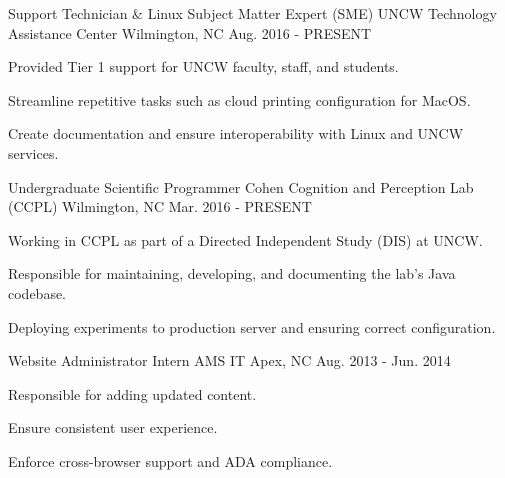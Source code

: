 

\begin{cventries}

  \cventry
    {Support Technician \& Linux Subject Matter Expert (SME)} %
    {UNCW Technology Assistance Center} %
    {Wilmington, NC} %
    {Aug. 2016 - PRESENT} %
    {
      \begin{cvitems} %
        \item {Provided Tier 1 support for UNCW faculty, staff, and students.}
        \item {Streamline repetitive tasks such as cloud printing configuration for MacOS.}
        \item {Create documentation and ensure interoperability with Linux and UNCW services.}
      \end{cvitems}
    }

  \cventry
    {Undergraduate Scientific Programmer} %
    {Cohen Cognition and Perception Lab (CCPL)} %
    {Wilmington, NC} %
    {Mar. 2016 - PRESENT} %
    {
      \begin{cvitems}
        \item {Working in CCPL as part of a Directed Independent Study (DIS) at UNCW.}
        \item {Responsible for maintaining, developing, and documenting the lab's Java codebase.}
        \item {Deploying experiments to production server and ensuring correct configuration.}
      \end{cvitems}
    }
  \cventry
    {Website Administrator Intern} %
    {AMS IT} %
    {Apex, NC} %
    {Aug. 2013 - Jun. 2014} %
    {
      \begin{cvitems}
        \item {Responsible for adding updated content.}
        \item {Ensure consistent user experience.}
        \item {Enforce cross-browser support and ADA compliance.}
      \end{cvitems}
    }
\end{cventries}
